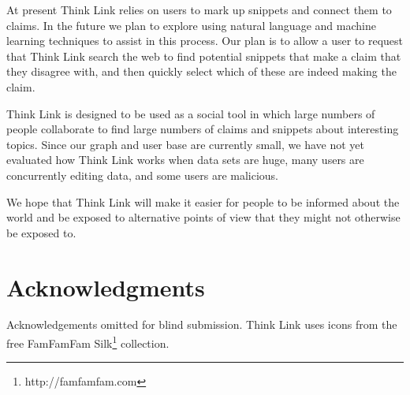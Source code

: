 \documentclass{chi2009}
\newcommand{\todo}[1]{}
\begin{document}
At present Think Link relies on users to mark up snippets and connect them to claims. In the future we plan to explore using natural language and machine learning techniques to assist in this process. Our plan is to allow a user to request that Think Link search the web to find potential snippets that make a claim that they disagree with, and then quickly select which of these are indeed making the claim.

Think Link is designed to be used as a social tool in which large numbers of people collaborate to find large numbers of claims and snippets about interesting topics. Since our graph and user base are currently small, we have not yet evaluated how Think Link works when data sets are huge, many users are concurrently editing data, and some users are malicious.

We hope that Think Link will make it easier for people to be informed about the world and be exposed to alternative points of view that they might not otherwise be exposed to.

\section{Acknowledgments}

Acknowledgements omitted for blind submission. Think Link uses icons from the free FamFamFam Silk\footnote{http://famfamfam.com} collection.


\todo{Sort out bad references}

\end{document}
